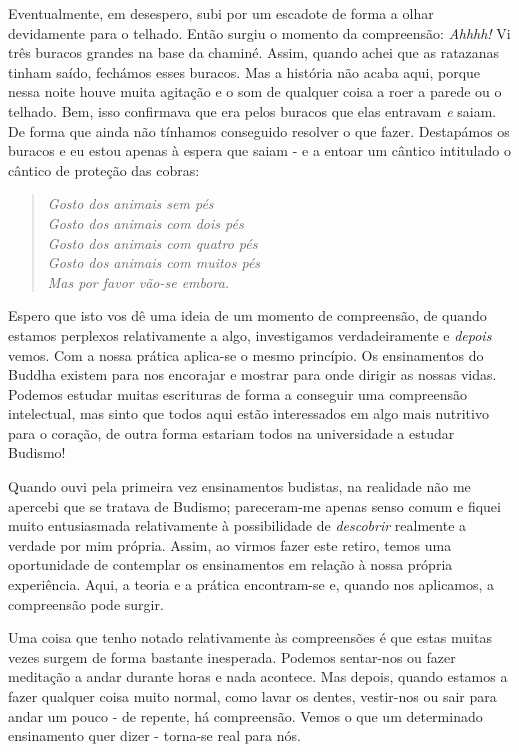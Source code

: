 Eventualmente, em desespero, subi por um escadote de forma a olhar
devidamente para o telhado. Então surgiu o momento da compreensão:
\emph{Ahhhh!} Vi três buracos grandes na base da chaminé. Assim, quando
achei que as ratazanas tinham saído, fechámos esses buracos. Mas a
história não acaba aqui, porque nessa noite houve muita agitação e o som
de qualquer coisa a roer a parede ou o telhado. Bem, isso confirmava que
era pelos buracos que elas entravam \emph{e} saiam. De forma que ainda
não tínhamos conseguido resolver o que fazer. Destapámos os buracos e eu
estou apenas à espera que saiam - e a entoar um cântico intitulado o
cântico de proteção das cobras:

\begin{quote}
  \itshape
  Gosto dos animais sem pés\\
  Gosto dos animais com dois pés\\
  Gosto dos animais com quatro pés\\
  Gosto dos animais com muitos pés\\
  Mas por favor vão-se embora.
\end{quote}

Espero que isto vos dê uma ideia de um momento de compreensão, de quando
estamos perplexos relativamente a algo, investigamos verdadeiramente e
\emph{depois} vemos. Com a nossa prática aplica-se o mesmo princípio. Os
ensinamentos do Buddha existem para nos encorajar e mostrar para onde
dirigir as nossas vidas. Podemos estudar muitas escrituras de forma a
conseguir uma compreensão intelectual, mas sinto que todos aqui estão
interessados em algo mais nutritivo para o coração, de outra forma
estariam todos na universidade a estudar Budismo!

Quando ouvi pela primeira vez ensinamentos budistas, na realidade não me
apercebi que se tratava de Budismo; pareceram-me apenas senso comum e
fiquei muito entusiasmada relativamente à possibilidade de
\emph{descobrir} realmente a verdade por mim própria. Assim, ao virmos
fazer este retiro, temos uma oportunidade de contemplar os ensinamentos
em relação à nossa própria experiência. Aqui, a teoria e a prática
encontram-se e, quando nos aplicamos, a compreensão pode surgir.

Uma coisa que tenho notado relativamente às compreensões é que estas
muitas vezes surgem de forma bastante inesperada. Podemos sentar-nos ou
fazer meditação a andar durante horas e nada acontece. Mas depois,
quando estamos a fazer qualquer coisa muito normal, como lavar os
dentes, vestir-nos ou sair para andar um pouco - de repente, há
compreensão. Vemos o que um determinado ensinamento quer dizer -
torna-se real para nós.

